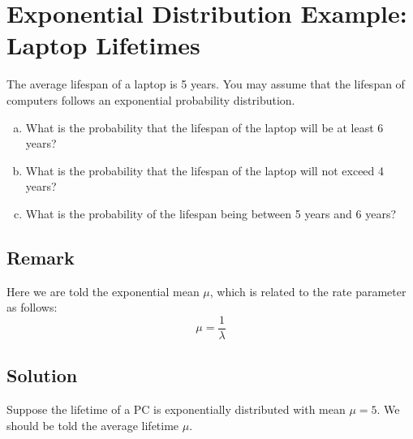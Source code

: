 \documentclass[a4paper,12pt]{article}
\begin{document}
\large 

\section*{Exponential Distribution Example: Laptop Lifetimes}

The average lifespan of a laptop is 5 years. You may assume that
the lifespan of computers follows an exponential probability
distribution. 
\begin{enumerate}[(a)]
\item  What is the
probability that the lifespan of the laptop will be at least 6
years? \item 

What is the probability that the lifespan of the laptop will not
exceed 4 years? \item  What is the probability of the
lifespan being between 5 years and 6 years?
\end{enumerate}
\medskip 
\subsection*{Remark}

Here we are told the exponential mean $\mu$, which is related to the rate parameter as follows:
\[ \mu = \frac{1}{\lambda}\]

\subsection*{Solution}
Suppose the lifetime of a PC is exponentially distributed with
mean $\mu =5$. We should be told the average lifetime $\mu$.
\end{document}
